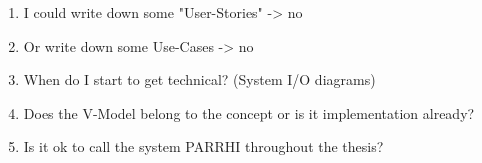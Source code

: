 \begin{enumerate}
	\setcounter{enumi}{0}
	\setlength\itemsep{-2em}
	\item I could write down some "User-Stories" -> no
	\item Or write down some Use-Cases -> no
	\item When do I start to get technical? (System I/O diagrams)
	\item Does the V-Model belong to the concept or is it implementation already?
	\item Is it ok to call the system PARRHI throughout the thesis?
\end{enumerate}


















